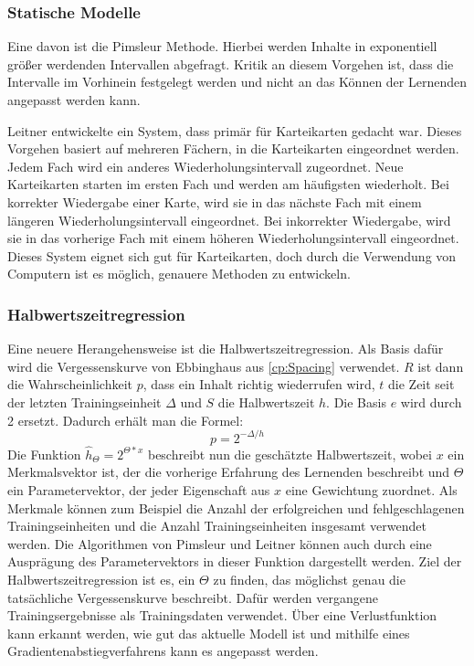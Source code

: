 \subsubsection{Statische Modelle}
Eine davon ist die Pimsleur Methode. Hierbei werden Inhalte in exponentiell größer werdenden Intervallen abgefragt. Kritik an diesem Vorgehen ist, dass die Intervalle im Vorhinein festgelegt werden und nicht an das Können der Lernenden angepasst werden kann.

Leitner \cite{leitner_so_1973} entwickelte ein System, dass primär für Karteikarten gedacht war. Dieses Vorgehen basiert auf mehreren Fächern, in die Karteikarten eingeordnet werden.
Jedem Fach wird ein anderes Wiederholungsintervall zugeordnet.
Neue Karteikarten starten im ersten Fach und werden am häufigsten wiederholt. Bei korrekter Wiedergabe einer Karte, wird sie in das nächste Fach mit einem längeren Wiederholungsintervall eingeordnet. Bei inkorrekter Wiedergabe, wird sie in das vorherige Fach mit einem höheren Wiederholungsintervall eingeordnet. Dieses System eignet sich gut für Karteikarten, doch durch die Verwendung von Computern ist es möglich, genauere Methoden zu entwickeln.

\subsubsection{Halbwertszeitregression}
Eine neuere Herangehensweise ist die Halbwertszeitregression. Als Basis dafür wird die Vergessenskurve von Ebbinghaus aus \autoref{cp:Spacing} verwendet. $R$ ist dann die Wahrscheinlichkeit $p$, dass ein Inhalt richtig wiederrufen wird, $t$ die Zeit seit der letzten Trainingseinheit $\Delta$ und $S$ die Halbwertszeit $h$. Die Basis $e$ wird durch 2 ersetzt. Dadurch erhält man die Formel:
$$p = 2^{-\Delta/h}$$
Die Funktion $\hat{h}_\Theta = 2^{\Theta*x}$ beschreibt nun die geschätzte Halbwertszeit, wobei $x$ ein Merkmalsvektor ist, der die vorherige Erfahrung des Lernenden beschreibt und $\Theta$ ein Parametervektor, der jeder Eigenschaft aus $x$ eine Gewichtung zuordnet. Als Merkmale können zum Beispiel die Anzahl der erfolgreichen und fehlgeschlagenen Trainingseinheiten und die Anzahl Trainingseinheiten insgesamt verwendet werden. Die Algorithmen von Pimsleur und Leitner können auch durch eine Ausprägung des Parametervektors in dieser Funktion dargestellt werden. Ziel der Halbwertszeitregression ist es, ein $\Theta$ zu finden, das möglichst genau die tatsächliche Vergessenskurve beschreibt. Dafür werden vergangene Trainingsergebnisse als Trainingsdaten verwendet. Über eine Verlustfunktion kann erkannt werden, wie gut das aktuelle Modell ist und mithilfe eines Gradientenabstiegverfahrens kann es angepasst werden.
\cite{settles_trainable_2016}

